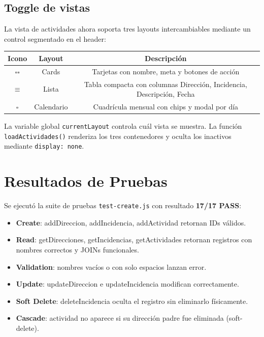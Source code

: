 \documentclass[12pt,a4paper]{article}
\begin{document}
\subsection{Toggle de vistas}

La vista de actividades ahora soporta tres layouts intercambiables mediante un control segmentado en el header:

\begin{center}
\begin{tabular}{|c|c|c|}
\hline
\textbf{Icono} & \textbf{Layout} & \textbf{Descripción} \\
\hline
$\square\square$ & Cards & Tarjetas con nombre, meta y botones de acción \\
$\equiv$ & Lista & Tabla compacta con columnas Dirección, Incidencia, Descripción, Fecha \\
$\square$ & Calendario & Cuadrícula mensual con chips y modal por día \\
\hline
\end{tabular}
\end{center}

La variable global \texttt{currentLayout} controla cuál vista se muestra. La función \texttt{loadActividades()} renderiza los tres contenedores y oculta los inactivos mediante \texttt{display: none}.

\section{Resultados de Pruebas}

Se ejecutó la suite de pruebas \texttt{test-create.js} con resultado \textbf{17/17 PASS}:

\begin{itemize}[leftmargin=*]
    \item \textbf{Create}: addDireccion, addIncidencia, addActividad retornan IDs válidos.
    \item \textbf{Read}: getDirecciones, getIncidencias, getActividades retornan registros con nombres correctos y JOINs funcionales.
    \item \textbf{Validation}: nombres vacíos o con solo espacios lanzan error.
    \item \textbf{Update}: updateDireccion e updateIncidencia modifican correctamente.
    \item \textbf{Soft Delete}: deleteIncidencia oculta el registro sin eliminarlo físicamente.
    \item \textbf{Cascade}: actividad no aparece si su dirección padre fue eliminada (soft-delete).
\end{itemize}
\end{document}
